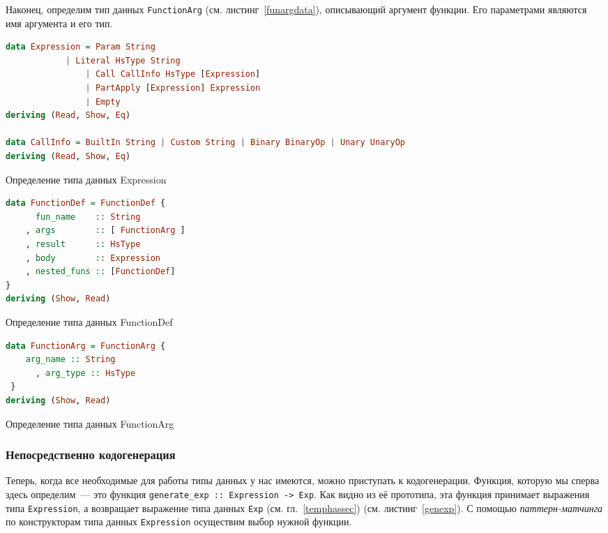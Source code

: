 		Наконец, определим тип данных \lstinline!FunctionArg! (см. листинг~\ref{funargdata}), описывающий аргумент функции. Его параметрами являются имя аргумента и его тип. 
		
		\begin{ListingEnv}[h]
		\begin{lstlisting}[language=Haskell]
data Expression = Param String
	        | Literal HsType String
                | Call CallInfo HsType [Expression]
                | PartApply [Expression] Expression
                | Empty
deriving (Read, Show, Eq)	
	
data CallInfo = BuiltIn String | Custom String | Binary BinaryOp | Unary UnaryOp
deriving (Read, Show, Eq)
		\end{lstlisting}
		\caption{Определение типа данных Expression}\label{expdata}
		\end{ListingEnv}
	
	\begin{ListingEnv}[h]
	\begin{lstlisting}[language=Haskell]
data FunctionDef = FunctionDef { 
	  fun_name    :: String
	, args        :: [ FunctionArg ]
	, result      :: HsType 
	, body        :: Expression
	, nested_funs :: [FunctionDef] 
} 
deriving (Show, Read)
	\end{lstlisting}
	\caption{Определение типа данных FunctionDef}\label{fundata}
	\end{ListingEnv}

\begin{ListingEnv}[h]
\begin{lstlisting}[language=Haskell]
data FunctionArg = FunctionArg { 
	arg_name :: String
      , arg_type :: HsType 
 }
deriving (Show, Read)
\end{lstlisting}
\caption{Определение типа данных FunctionArg}\label{funargdata}
\end{ListingEnv}
		
		\subsubsection{Непосредственно кодогенерация}
		Теперь, когда все необходимые для работы типы данных у нас имеются, можно приступать к кодогенерации. Функция, которую мы сперва здесь определим~--- это функция \lstinline!generate_exp :: Expression -> Exp!. Как видно из её прототипа, эта функция принимает выражения типа \lstinline!Expression!, а возвращает выражение типа данных \lstinline!Exp! (см. гл.~\ref{temphassec}) (см. листинг~\ref{genexp}). С помощью \textit{паттерн-матчинга} по конструкторам типа данных \lstinline!Expression! осуществим выбор нужной функции.

